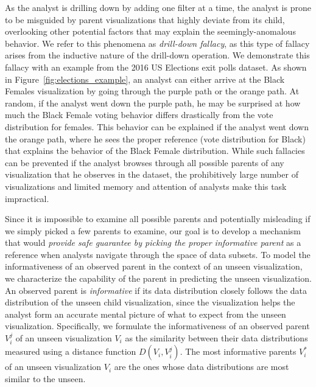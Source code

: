 \par As the analyst is drilling down by adding one filter at a time, the analyst is prone to be misguided by parent visualizations that highly deviate from its child, overlooking other potential factors that may explain the seemingly-anomalous behavior. We refer to this phenomena as \emph{drill-down fallacy}, as this type of fallacy arises from the inductive nature of the drill-down operation. We demonstrate this fallacy with an example from the 2016 US Elections exit polls dataset. As shown in Figure~\ref{fig:elections_example}, an analyst can either arrive at the Black Females visualization by going through the purple path or the orange path. At random, if the analyst went down the purple path, he may be surprised at how much the Black Female voting behavior differs drastically from the vote distribution for females. This behavior can be explained if the analyst went down the orange path, where he sees the proper reference (vote distribution for Black) that explains the behavior of the Black Female distribution. While such fallacies can be prevented if the analyst browses through all possible parents of any visualization that he observes in the dataset, the prohibitively large number of visualizations and limited memory and attention of analysts make this task impractical.
\par Since it is impossible to examine all possible parents and potentially misleading if we simply picked a few parents to examine, our goal is to develop a mechanism that would  \emph{provide safe guarantee by picking the proper informative parent} as a reference when analysts navigate through the space of data subsets.  To model the informativeness of an observed parent in the context of an unseen visualization, we characterize the capability of the parent in predicting the unseen visualization. An observed parent is \emph{informative} if its data distribution closely follows the data distribution of the unseen child visualization, since the visualization helps the analyst form an accurate mental picture of what to expect from the unseen visualization. Specifically, we formulate the informativeness of an observed parent $V_i^j$ of an unseen visualization $V_i$ as the similarity between their data distributions measured using a distance function $D(V_i, V_i^j)$. The most informative parents $V_i^*$ of an unseen visualization $V_i$ are the ones whose data distributions are most similar to the unseen.
